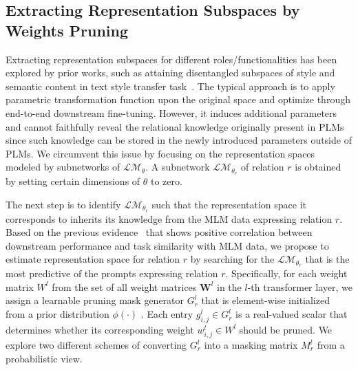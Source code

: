 \label{sec:prompts}
\subsection{Extracting Representation Subspaces by Weights Pruning}
\label{sec:pruning}
Extracting representation subspaces for different roles/functionalities has been explored by prior works, such as attaining disentangled subspaces of style and semantic content in text style transfer task~\cite{disen}. The typical approach is to apply parametric transformation function upon the original space and optimize through end-to-end downstream fine-tuning. However, it induces additional parameters and cannot faithfully reveal the relational knowledge originally present in PLMs since such knowledge can be stored in the newly introduced parameters outside of PLMs. We circumvent this issue by focusing on the representation spaces modeled by subnetworks of $\mathcal{LM}_\theta$. A subnetwork $\mathcal{LM}_{\theta_r}$ of relation $r$  is obtained by setting certain dimensions of $\theta$ to zero. 

The next step is  to identify $\mathcal{LM}_{\theta_r}$ such that the representation space it corresponds to 
inherits its knowledge from the MLM data expressing relation $r$. 
Based on the previous evidence~\cite{inductivemlm} that shows positive correlation between downstream performance and 
task similarity with MLM data, 
we propose to estimate representation space for relation $r$ by searching for the $\mathcal{LM}_{\theta_r}$ 
that is the most predictive of the prompts expressing relation $r$. 
Specifically, for each weight matrix $W^l$ from the set of all weight matrices $\bm{W}^l$ in 
the $l$-th transformer layer, we assign 
a learnable pruning mask generator $G_r^l$ 
that is element-wise initialized from a prior distribution $\phi(\cdot)$ .
Each entry $g_{i,j}^l\in G_r^l$ is a real-valued scalar that determines whether its corresponding weight $w_{i,j}^l\in W^l$ should be pruned. We explore two different schemes of converting $G_r^l$ into a masking matrix $M_r^l$ from a probabilistic view.

